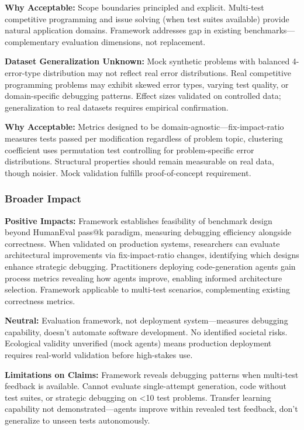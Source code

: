 \textbf{Why Acceptable:} Scope boundaries principled and explicit. Multi-test competitive programming and issue solving (when test suites available) provide natural application domains. Framework addresses gap in existing benchmarks---complementary evaluation dimensions, not replacement.

\textbf{Dataset Generalization Unknown:} Mock synthetic problems with balanced 4-error-type distribution may not reflect real error distributions. Real competitive programming problems may exhibit skewed error types, varying test quality, or domain-specific debugging patterns. Effect sizes validated on controlled data; generalization to real datasets requires empirical confirmation.

\textbf{Why Acceptable:} Metrics designed to be domain-agnostic---fix-impact-ratio measures tests passed per modification regardless of problem topic, clustering coefficient uses permutation test controlling for problem-specific error distributions. Structural properties should remain measurable on real data, though noisier. Mock validation fulfills proof-of-concept requirement.

\subsubsection{Broader Impact}

\textbf{Positive Impacts:} Framework establishes feasibility of benchmark design beyond HumanEval pass@k paradigm, measuring debugging efficiency alongside correctness. When validated on production systems, researchers can evaluate architectural improvements via fix-impact-ratio changes, identifying which designs enhance strategic debugging. Practitioners deploying code-generation agents gain process metrics revealing how agents improve, enabling informed architecture selection. Framework applicable to multi-test scenarios, complementing existing correctness metrics.

\textbf{Neutral:} Evaluation framework, not deployment system---measures debugging capability, doesn't automate software development. No identified societal risks. Ecological validity unverified (mock agents) means production deployment requires real-world validation before high-stakes use.

\textbf{Limitations on Claims:} Framework reveals debugging patterns when multi-test feedback is available. Cannot evaluate single-attempt generation, code without test suites, or strategic debugging on <10 test problems. Transfer learning capability not demonstrated---agents improve within revealed test feedback, don't generalize to unseen tests autonomously.

